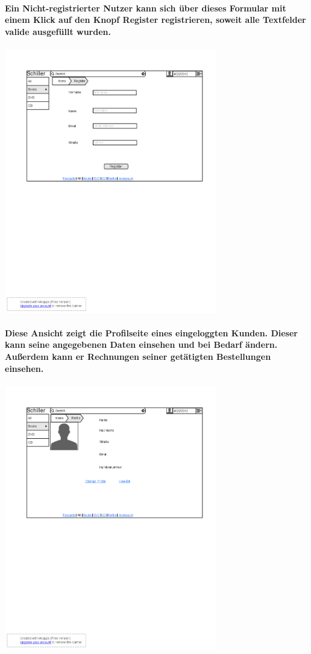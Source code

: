 \documentclass[a4paper]{article}
\begin{document}
\paragraph{Ein Nicht-registrierter Nutzer kann sich über dieses Formular mit einem Klick auf den Knopf Register registrieren, soweit alle Textfelder valide ausgefüllt wurden.\\}
\includegraphics[width=350px]{3Register.png}

\paragraph{Diese Ansicht zeigt die Profilseite eines eingeloggten Kunden. Dieser kann seine angegebenen Daten einsehen und bei Bedarf ändern. Außerdem kann er Rechnungen seiner getätigten Bestellungen einsehen.\\}
\includegraphics[width=350px]{4ProfileView.png}
\end{document}
